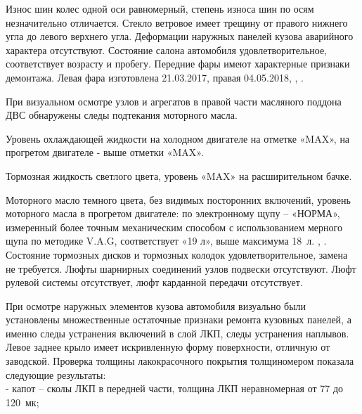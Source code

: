 
 Износ шин колес одной оси равномерный, степень износа шин по осям незначительно отличается.   Стекло ветровое имеет трещину от правого нижнего угла до левого верхнего угла. Деформации  наружных панелей кузова аварийного характера отсутствуют. Состояние салона автомобиля удовлетворительное, соответствует возрасту и пробегу.  Передние фары имеют характерные признаки демонтажа.  Левая фара изготовлена 21.03.2017, правая 04.05.2018, , .
 
 
 При визуальном осмотре узлов и агрегатов в правой части масляного поддона ДВС обнаружены следы подтекания  моторного масла.
   
 Уровень охлаждающей жидкости на холодном двигателе на отметке «MAX», на прогретом двигателе - выше отметки «MAX». 
 
 Тормозная жидкость  светлого цвета, уровень «MAX» на расширительном бачке.
 
 Моторного масло темного цвета, без видимых посторонних включений, уровень моторного масла в прогретом двигателе: по электронному щупу – «НОРМА»,   измеренный более точным механическим способом с использованием мерного щупа по методике V.A.G,  соответствует «19 л»,  выше максимума 18~л. , . Состояние тормозных дисков и тормозных колодок удовлетворительное,  замена не требуется. Люфты шарнирных соединений узлов подвески отсутствуют. Люфт рулевой системы отсутствует,  люфт карданной передачи отсутствует. 
 
 
При осмотре наружных элементов кузова  автомобиля визуально были установлены множественные остаточные признаки ремонта кузовных панелей, а именно следы устранения включений в слой ЛКП, следы устранения наплывов. Левое заднее крыло имеет искривленную форму поверхности, отличную от заводской.  Проверка толщины лакокрасочного покрытия  толщиномером  показала следующие результаты:\\

- капот – сколы ЛКП в передней части, толщина ЛКП неравномерная от 77 до 120 мк;


